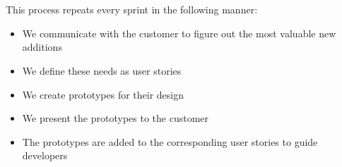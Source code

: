 \\\\
This process repeats every sprint in the following manner:
\begin{itemize}
    \item We communicate with the customer to figure out the most valuable new additions
    \item We define these needs as user stories
    \item We create prototypes for their design
    \item We present the prototypes to the customer
    \item The prototypes are added to the corresponding user stories to guide developers
\end{itemize}

